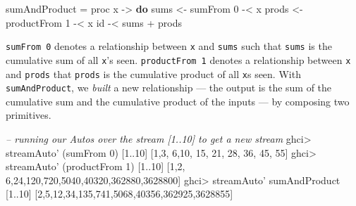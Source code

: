 \documentclass[]{article}
\newenvironment{Shaded}{}{}
\newcommand{\KeywordTok}[1]{\textcolor[rgb]{0.00,0.44,0.13}{\textbf{{#1}}}}
\newcommand{\DecValTok}[1]{\textcolor[rgb]{0.25,0.63,0.44}{{#1}}}
\newcommand{\CommentTok}[1]{\textcolor[rgb]{0.38,0.63,0.69}{\textit{{#1}}}}
\newcommand{\OtherTok}[1]{\textcolor[rgb]{0.00,0.44,0.13}{{#1}}}
\newcommand{\FunctionTok}[1]{\textcolor[rgb]{0.02,0.16,0.49}{{#1}}}
\newcommand{\NormalTok}[1]{{#1}}
\begin{document}
\begin{Shaded}
\begin{Highlighting}[]
\NormalTok{sumAndProduct }\FunctionTok{=} \NormalTok{proc x }\OtherTok{->} \KeywordTok{do}
    \NormalTok{sums  }\OtherTok{<-} \NormalTok{sumFrom }\DecValTok{0}     \FunctionTok{-<} \NormalTok{x}
    \NormalTok{prods }\OtherTok{<-} \NormalTok{productFrom }\DecValTok{1} \FunctionTok{-<} \NormalTok{x}
    \NormalTok{id }\FunctionTok{-<} \NormalTok{sums }\FunctionTok{+} \NormalTok{prods}
\end{Highlighting}
\end{Shaded}

\texttt{sumFrom\ 0} denotes a relationship between \texttt{x} and \texttt{sums}
such that \texttt{sums} is the cumulative sum of all \texttt{x}'s seen.
\texttt{productFrom\ 1} denotes a relationship between \texttt{x} and
\texttt{prods} that \texttt{prods} is the cumulative product of all \texttt{x}s
seen. With \texttt{sumAndProduct}, we \emph{built} a new relationship --- the
output is the sum of the cumulative sum and the cumulative product of the inputs
--- by composing two primitives.

\begin{Shaded}
\begin{Highlighting}[]
\CommentTok{-- running our Autos over the stream [1..10] to get a new stream}
\NormalTok{ghci}\FunctionTok{>} \NormalTok{streamAuto' (sumFrom }\DecValTok{0}\NormalTok{) [}\DecValTok{1}\FunctionTok{..}\DecValTok{10}\NormalTok{]}
\NormalTok{[}\DecValTok{1}\NormalTok{,}\DecValTok{3}\NormalTok{, }\DecValTok{6}\NormalTok{,}\DecValTok{10}\NormalTok{, }\DecValTok{15}\NormalTok{, }\DecValTok{21}\NormalTok{,  }\DecValTok{28}\NormalTok{,   }\DecValTok{36}\NormalTok{,    }\DecValTok{45}\NormalTok{,     }\DecValTok{55}\NormalTok{]}
\NormalTok{ghci}\FunctionTok{>} \NormalTok{streamAuto' (productFrom }\DecValTok{1}\NormalTok{) [}\DecValTok{1}\FunctionTok{..}\DecValTok{10}\NormalTok{]}
\NormalTok{[}\DecValTok{1}\NormalTok{,}\DecValTok{2}\NormalTok{, }\DecValTok{6}\NormalTok{,}\DecValTok{24}\NormalTok{,}\DecValTok{120}\NormalTok{,}\DecValTok{720}\NormalTok{,}\DecValTok{5040}\NormalTok{,}\DecValTok{40320}\NormalTok{,}\DecValTok{362880}\NormalTok{,}\DecValTok{3628800}\NormalTok{]}
\NormalTok{ghci}\FunctionTok{>} \NormalTok{streamAuto' sumAndProduct [}\DecValTok{1}\FunctionTok{..}\DecValTok{10}\NormalTok{]}
\NormalTok{[}\DecValTok{2}\NormalTok{,}\DecValTok{5}\NormalTok{,}\DecValTok{12}\NormalTok{,}\DecValTok{34}\NormalTok{,}\DecValTok{135}\NormalTok{,}\DecValTok{741}\NormalTok{,}\DecValTok{5068}\NormalTok{,}\DecValTok{40356}\NormalTok{,}\DecValTok{362925}\NormalTok{,}\DecValTok{3628855}\NormalTok{]}
\end{Highlighting}
\end{Shaded}
\end{document}
